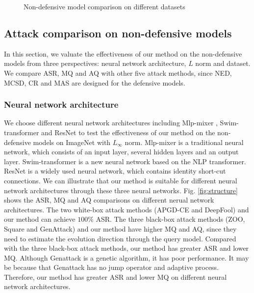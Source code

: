 \documentclass[lettersize,journal]{IEEEtran}
\begin{document}
	\begin{figure*}[t]
		\centering
		
		\caption{Non-defensive model comparison on different datasets}
		\label{fig:dataset}
	\end{figure*}
	
	\subsection{Attack comparison on non-defensive models}
	
	In this section, we valuate the effectiveness of our method on the non-defensive models from three perspectives: neural network architecture, $L$ norm and dataset. We compare ASR, MQ and AQ with other five attack methods, since NED, MCSD, CR and MAS are designed for the defensive models. 
	
	\subsubsection{Neural network architecture}
	
	We choose different neural network architectures including Mlp-mixer \cite{tolstikhin2021mlpmixer}, Swim-transformer \cite{liu2021Swin} and ResNet \cite{he2016deep} to test the effectiveness of our method on the non-defensive models on ImageNet with $L_\infty$ norm. 
	Mlp-mixer is a traditional neural network, which consists of an input layer, several hidden layers and an output layer. Swim-transformer is a new neural network based on the NLP transformer. ResNet is a widely used neural network, which contains identity short-cut connections. 
	We can illustrate that our method is suitable for different neural network architectures through these three neural networks. 
	Fig. \ref{fig:structure} shows the ASR, MQ and AQ comparisons on different nerual network architectures. The two white-box attack methods (APGD-CE and DeepFool) and our method can achieve $100\%$ ASR. The three black-box attack methods (ZOO, Square and GenAttack) and our method have higher MQ and AQ, since they need to estimate the evolution direction through the query model. Compared with the three black-box attack methods, our method has greater ASR and lower MQ. 
	Although Genattack is a genetic algorithm, it has poor performance. It may be because that Genattack has no jump operator and adaptive process. 
	Therefore, our method has greater ASR and lower MQ on different neural network architectures.
	
\end{document}
